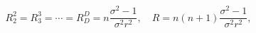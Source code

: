 \begin{equation}
R_{2}^{2}=R_{3}^{3}=\cdots =R_{D}^{D}=n\frac{\sigma ^{2}-1}{\sigma
^2 r^{2}},\quad R=n(n+1)\frac{\sigma ^{2}-1}{\sigma ^2r^{2}},
\label{mRictens}
\end{equation}

